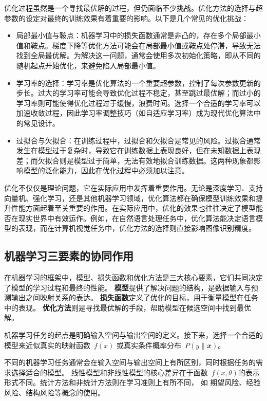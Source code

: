 优化过程虽然是一个寻找最优解的过程，但仍面临不少挑战。优化方法的选择与超参数的设定对最终的训练效果有着重要的影响。以下是几个常见的优化挑战：
 \begin{itemize} 
\item 局部最小值与鞍点：机器学习中的损失函数通常是非凸的，存在多个局部最小值和鞍点。梯度下降等优化方法可能会在局部最小值或鞍点处停滞，导致无法找到全局最优解。为解决这一问题，通常会使用多次初始化策略，即从不同的随机起点开始优化，来避免陷入局部最小值。
\item 学习率的选择：学习率是优化算法的一个重要超参数，控制了每次参数更新的步长。过大的学习率可能会导致优化过程不稳定，甚至跳过最优解；而过小的学习率则可能使得优化过程过于缓慢，浪费时间。选择一个合适的学习率可以加速收敛过程，因此学习率调整技巧（如自适应学习率）成为现代优化算法中的常见设计。
\item  过拟合与欠拟合：在训练过程中，过拟合和欠拟合是常见的风险。过拟合通常发生在模型过于复杂时，导致它在训练数据上表现良好，但在未知数据上表现差；而欠拟合则是模型过于简单，无法有效地拟合训练数据。这两种现象都影响模型的泛化能力，因此在优化过程中必须加以注意。
  \end{itemize}

优化不仅仅是理论问题，它在实际应用中发挥着重要作用。无论是深度学习、支持向量机、强化学习，还是其他机器学习领域，优化算法都在确保模型训练效果和提升性能方面起着至关重要的作用。在实际应用中，优化的效果也往往决定了模型能否在现实世界中有效运作。例如，在自然语言处理任务中，优化算法能决定语言模型的表现，而在计算机视觉任务中，优化方法的选择则直接影响图像识别精度。

 \subsection{机器学习三要素的协同作用}
在机器学习的框架中，模型、损失函数和优化方法是三大核心要素，它们共同决定了模型的学习过程和最终的性能。
{\bf 模型}提供了解决问题的结构，是数据输入与预测输出之间映射关系的表达。
{\bf 损失函数}定义了优化的目标，用于衡量模型在任务中的表现。
{\bf 优化方法}则是寻找最优解的手段，帮助模型在候选空间中找到最优解。

机器学习任务的起点是明确输入空间与输出空间的定义。接下来，选择一个合适的模型来近似真实的映射函数~$f(𝑥)$ 或真实条件概率分布~$𝑃(𝑦\|𝒙)$。

不同的机器学习任务通常会在输入空间与输出空间上有所区别，同时根据任务的需求选择适合的模型。
线性模型和非线性模型的核心差异在于函数~$ f(x, \theta)$的表示形式不同。统计方法和非统计方法则在学习准则上有所不同， 如
		期望风险、经验风险、结构风险等概念的使用。

